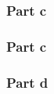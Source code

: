 \documentclass{article}
\begin{document}
\subsubsection*{Part c}

\subsubsection*{Part c}

\subsubsection*{Part d}
\end{document}
